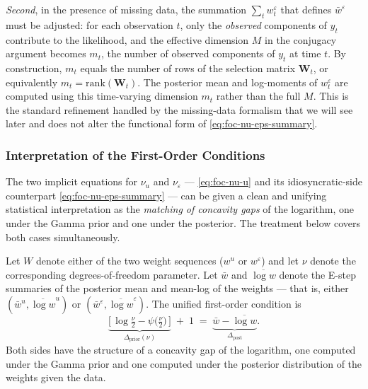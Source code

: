 \documentclass[11pt, a4paper, oneside]{article}
\begin{document}
\emph{Second}, in the presence of missing data, the summation
$\sum_t w^\varepsilon_t$ that defines $\bar{w}^\varepsilon$ must be
adjusted: for each observation $t$, only the \emph{observed} components
of $y_t$ contribute to the likelihood, and the effective dimension $M$ in the conjugacy argument becomes $m_t$,
the number of observed components of $y_t$ at time $t$. By
construction, $m_t$ equals the number of rows of the selection
matrix $\mathbf{W}_t$, or equivalently $m_t = \mathrm{rank}(\mathbf{W}_t)$.
The posterior mean and log-moments of $w^\varepsilon_t$ are computed using this time-varying
dimension $m_t$ rather than the full $M$. This is the standard
refinement handled by the missing-data formalism that we will see later and does not alter the functional form
of \eqref{eq:foc-nu-eps-summary}.


\subsubsection{Interpretation of the First-Order Conditions}
\label{subsec:nu-interpretation}

The two implicit equations for $\nu_u$ and $\nu_\varepsilon$ —
\eqref{eq:foc-nu-u} and its idiosyncratic-side counterpart
\eqref{eq:foc-nu-eps-summary} — can be given a clean and unifying
statistical interpretation as the \emph{matching of concavity gaps}
of the logarithm, one under the Gamma prior and one under the
posterior. The treatment below covers both cases simultaneously.

Let $W$ denote either of the two weight sequences 
($w^u$ or $w^\varepsilon$) and let $\nu$ denote the corresponding
degrees-of-freedom parameter. Let $\bar{w}$ and $\overline{\log w}$
denote the E-step summaries of the posterior mean and mean-log of the
weights — that is, either $(\bar{w}^u, \overline{\log w}^u)$ or
$(\bar{w}^\varepsilon, \overline{\log w}^\varepsilon)$. The unified
first-order condition is
\begin{equation}
\underbrace{\big[\,\log\!\tfrac{\nu}{2} - \psi\!\big(\tfrac{\nu}{2}\big)\,\big]}_{\displaystyle \Delta_{\text{prior}}(\nu)}
\;+\; 1 \;=\; \underbrace{\bar{w} - \overline{\log w}}_{\displaystyle \Delta_{\text{post}}}.
\label{eq:nu-interpretation}
\end{equation}
Both sides have the structure of a concavity gap of the logarithm,
one computed under the Gamma prior and one computed under the
posterior distribution of the weights given the data.
\end{document}
